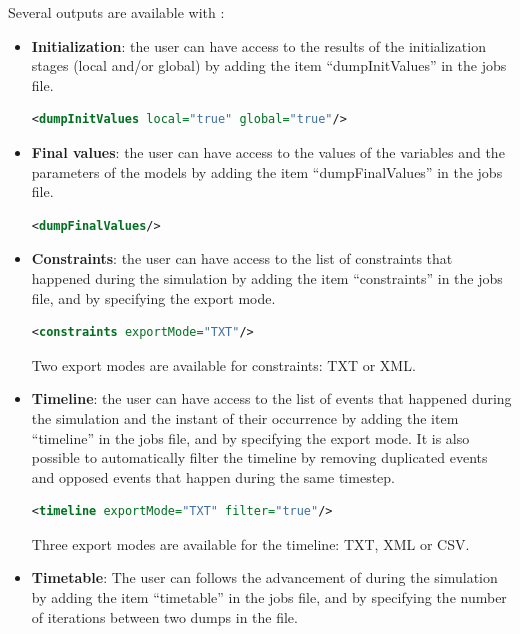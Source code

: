 \documentclass[a4paper, 12pt]{report}
\begin{document}
Several outputs are available with \Dynawo:
\begin{itemize}
\item \textbf{Initialization}: the user can have access to the results of the initialization stages (local and/or global) by adding the item ``dumpInitValues'' in the jobs file.

\begin{lstlisting}[language=XML, morekeywords={dumpInitValues},numbers=none]
<dumpInitValues local="true" global="true"/>
\end{lstlisting}

\item \textbf{Final values}: the user can have access to the values of the variables and the parameters of the models by adding the item ``dumpFinalValues'' in the jobs file.

\begin{lstlisting}[language=XML, morekeywords={dumpFinalValues},numbers=none]
<dumpFinalValues/>
\end{lstlisting}

\item \textbf{Constraints}: the user can have access to the list of constraints that happened during the simulation by adding the item ``constraints'' in the jobs file, and by specifying the export mode.
\begin{lstlisting}[language=XML, morekeywords={constraints},numbers=none]
<constraints exportMode="TXT"/>
\end{lstlisting}
Two export modes are available for constraints: TXT or XML.

\item \textbf{Timeline}: the user can have access to the list of events that happened during the simulation and the instant of their occurrence by adding the item ``timeline'' in the jobs file, and by specifying the export mode. It is also possible to automatically filter the timeline by removing duplicated events and opposed events that happen during the same timestep.

\begin{lstlisting}[language=XML, morekeywords={timeline},numbers=none]
<timeline exportMode="TXT" filter="true"/>
\end{lstlisting}
Three export modes are available for the timeline: TXT, XML or CSV.

\item \textbf{Timetable}: The user can follows the advancement of \Dynawo during the simulation by adding the item ``timetable'' in the jobs file, and by specifying the number of iterations between two dumps in the file.


\end{itemize}
\end{document}

